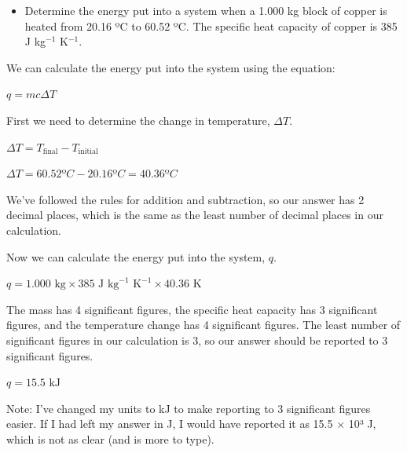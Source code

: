 \documentclass[
  letterpaper,
  DIV=11,
  numbers=noendperiod]{scrreprt}
\providecommand{\tightlist}{%
  \setlength{\itemsep}{0pt}\setlength{\parskip}{0pt}}
\begin{document}
\begin{tcolorbox}[enhanced jigsaw, arc=.35mm, bottomrule=.15mm, bottomtitle=1mm, breakable, colback=white, colbacktitle=quarto-callout-caution-color!10!white, colframe=quarto-callout-caution-color-frame, coltitle=black, left=2mm, leftrule=.75mm, opacityback=0, opacitybacktitle=0.6, rightrule=.15mm, title=\textcolor{quarto-callout-caution-color}{\faFire}\hspace{0.5em}{Example of significant figures in multiplication and division - heat
capacity.}, titlerule=0mm, toprule=.15mm, toptitle=1mm]

\begin{itemize}
\tightlist
\item
  Determine the energy put into a system when a 1.000 kg block of copper
  is heated from 20.16 ºC to 60.52 ºC. The specific heat capacity of
  copper is 385 J kg\(^{-1}\) K\(^{-1}\).
\end{itemize}

We can calculate the energy put into the system using the equation:

\(q = m c \Delta T\)

First we need to determine the change in temperature, \(\Delta T\).

\(\Delta T = T_{\textrm{final}} - T_{\textrm{initial}}\)

\(\Delta T = 60.52 ºC - 20.16 ºC = 40.36 ºC\)

We've followed the rules for addition and subtraction, so our answer has
2 decimal places, which is the same as the least number of decimal
places in our calculation.

Now we can calculate the energy put into the system, \(q\).

\(q = 1.000 \textrm{ kg} \times 385 \textrm{ J kg}^{-1} \textrm{ K}^{-1} \times 40.36 \textrm{ K}\)

The mass has 4 significant figures, the specific heat capacity has 3
significant figures, and the temperature change has 4 significant
figures. The least number of significant figures in our calculation is
3, so our answer should be reported to 3 significant figures.

\(q = 15.5 \textrm{ kJ}\)

Note: I've changed my units to kJ to make reporting to 3 significant
figures easier. If I had left my answer in J, I would have reported it
as 15.5 \(\times\) 10³ J, which is not as clear (and is more to type).

\end{tcolorbox}
\end{document}
